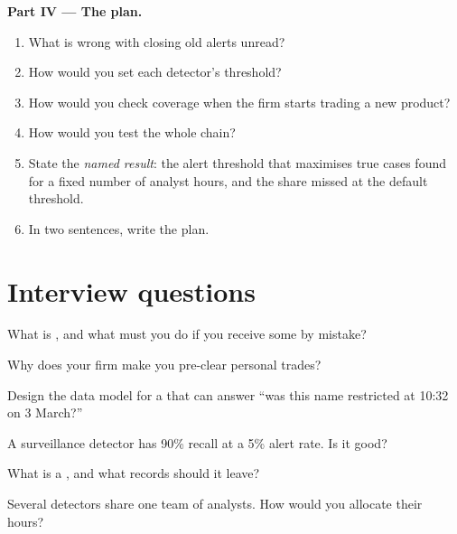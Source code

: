 \begin{problem}
\medskip\noindent\textbf{Part IV --- The plan.}
\begin{enumerate}[resume]
\item What is wrong with closing old alerts unread?
\item How would you set each detector's threshold?
\item How would you check coverage when the firm starts trading a new product?
\item How would you test the whole chain?
\item State the \emph{named result}: the alert threshold that maximises true cases found for a fixed number of analyst hours, and the share
missed at the default threshold.
\item In two sentences, write the plan.
\end{enumerate}
\end{problem}

\section{Interview questions}

\begin{interviewq}\label{iq:fm:compliance-and-market-abuse:1}
What is , and what must you do if you receive some by mistake?
\end{interviewq}

\begin{interviewq}\label{iq:fm:compliance-and-market-abuse:2}
Why does your firm make you pre-clear personal trades?
\end{interviewq}

\begin{interviewq}\label{iq:fm:compliance-and-market-abuse:3}
Design the data model for a  that can answer ``was this name restricted at 10:32 on 3 March?''
\end{interviewq}

\begin{interviewq}\label{iq:fm:compliance-and-market-abuse:4}
A surveillance detector has 90\% recall at a 5\% alert rate. Is it good?
\end{interviewq}

\begin{interviewq}\label{iq:fm:compliance-and-market-abuse:5}
What is a , and what records should it leave?
\end{interviewq}

\begin{interviewq}\label{iq:fm:compliance-and-market-abuse:6}
Several detectors share one team of analysts. How would you allocate their hours?
\end{interviewq}
